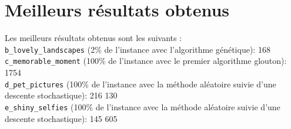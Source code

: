 \documentclass[12pt,a4paper]{article}
\begin{document}
\section{Meilleurs résultats obtenus}

\vspace{1\baselineskip}

\noindent Les meilleurs résultats obtenus sont les suivants :
\vspace{1\baselineskip}\\
\verb|b_lovely_landscapes| (2\% de l'instance avec l'algorithme génétique): 168  \\
\verb|c_memorable_moment| (100\% de l'instance avec le premier algorithme glouton): 1754 \\ 
\verb|d_pet_pictures| (100\% de l'instance avec la méthode aléatoire suivie d'une descente stochastique): 216 130 \\
\verb|e_shiny_selfies| (100\% de l'instance avec la méthode aléatoire suivie d'une descente stochastique): 145 605 
\end{document}

